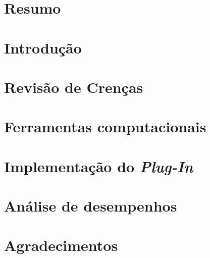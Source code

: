 \documentclass[12pt, a4paper]{report}
\begin{document}
	
	\chapter*{Resumo}
	\chapter*{Introdução}
	
	
	
	
	\chapter{Revisão de Crenças}
	\chapter{Ferramentas computacionais}
	\chapter{Implementação do \textit{Plug-In}}
	\chapter{Análise de desempenhos}
	\chapter*{Agradecimentos}
	
	
	
	 
\end{document}
